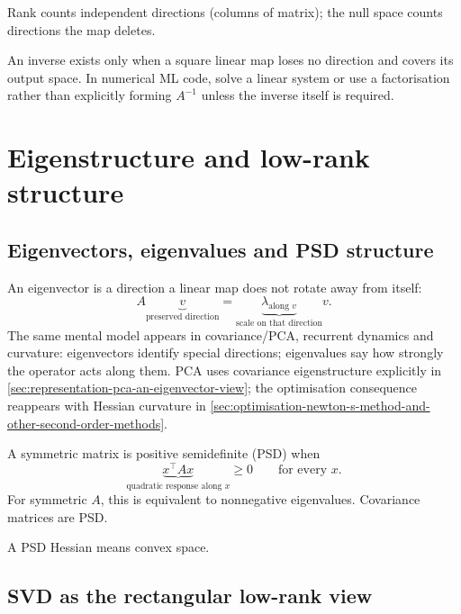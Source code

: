 \begin{calloutmemoryhook}
Rank counts independent directions (columns of matrix); the null space counts directions the map deletes.
\end{calloutmemoryhook}

An inverse exists only when a square linear map loses no direction and covers its output space.
In numerical ML code, solve a linear system or use a factorisation rather than explicitly forming $A^{-1}$ unless the inverse itself is required.
\label{subsec:la-inverse-of-a-matrix}
\label{subsec:la-determinant}

\section{Eigenstructure and low-rank structure}
\label{sec:foundations-eigenstructure-and-low-rank-structure}
\label{sec:la-eigenstructure-and-matrix-properties}

\subsection{Eigenvectors, eigenvalues and PSD structure}
\label{subsec:la-eigenvectors-and-eigenvalues}
\label{subsec:la-positive-semi-definite-psd-matrices}

An eigenvector is a direction a linear map does not rotate away from itself:
\[
A\underbrace{v}_{\text{preserved direction}}
=
\underbrace{\lambda_{\text{along }v}}_{\text{scale on that direction}}v.
\]
The same mental model appears in covariance/PCA, recurrent dynamics and curvature: eigenvectors identify special directions; eigenvalues say how strongly the operator acts along them.
PCA uses covariance eigenstructure explicitly in \cref{sec:representation-pca-an-eigenvector-view}; the optimisation consequence reappears with Hessian curvature in \cref{sec:optimisation-newton-s-method-and-other-second-order-methods}.

A symmetric matrix is positive semidefinite (PSD) when
\[
\underbrace{x^\top A x}_{\text{quadratic response along }x}\ge 0\qquad\text{for every }x.
\]
For symmetric $A$, this is equivalent to nonnegative eigenvalues.
Covariance matrices are PSD.
\begin{calloutmemoryhook}
A PSD Hessian means convex space.
\end{calloutmemoryhook}

\subsection{SVD as the rectangular low-rank view}
\label{subsec:foundations-svd}

